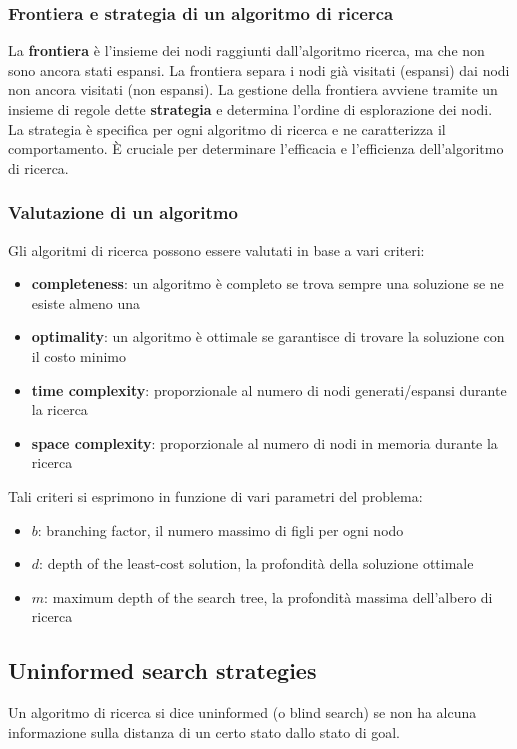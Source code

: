 \subsubsection*{Frontiera e strategia di un algoritmo di ricerca}
La \textbf{frontiera} è l'insieme dei nodi raggiunti dall'algoritmo ricerca, ma che non sono ancora stati espansi. La frontiera
separa i nodi già visitati (espansi) dai nodi non ancora visitati (non espansi). La gestione della frontiera avviene tramite un
insieme di regole dette \textbf{strategia} e determina l'ordine di esplorazione dei nodi. La strategia è specifica per ogni
algoritmo di ricerca e ne caratterizza il comportamento. È cruciale per determinare l'efficacia e l'efficienza 
dell'algoritmo di ricerca. 

\subsubsection*{Valutazione di un algoritmo}
Gli algoritmi di ricerca possono essere valutati in base a vari criteri:
\begin{itemize}
	\item \textbf{completeness}: un algoritmo è completo se trova sempre una soluzione se ne esiste almeno una
	\item \textbf{optimality}: un algoritmo è ottimale se garantisce di trovare la soluzione con il costo minimo
	\item \textbf{time complexity}: proporzionale al numero di nodi generati/espansi durante la ricerca
	\item \textbf{space complexity}: proporzionale al numero di nodi in memoria durante la ricerca
\end{itemize}
Tali criteri si esprimono in funzione di vari parametri del problema:
\begin{itemize}
	\item \(b\): branching factor, il numero massimo di figli per ogni nodo
	\item \(d\): depth of the least-cost solution, la profondità della soluzione ottimale
	\item \(m\): maximum depth of the search tree, la profondità massima dell'albero di ricerca
\end{itemize}

\subsection{Uninformed search strategies}
Un algoritmo di ricerca si dice uninformed (o blind search) se non ha alcuna informazione sulla distanza di un certo stato
dallo stato di goal.
